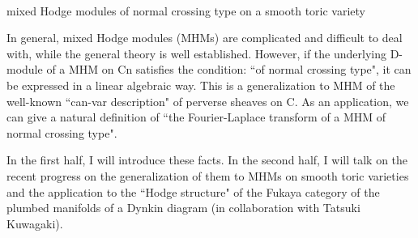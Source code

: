 \documentclass[dvipdfmx,a4paper,12pt]{article}
\theoremstyle{plain} %
\theoremstyle{definition} %
\begin{document}
\\
mixed Hodge modules of normal crossing type on a smooth toric variety

\vskip3mm
In general, mixed Hodge modules (MHMs) are complicated and difficult to 
deal with, while the general theory is well established.
However, if the underlying D-module of a MHM on Cn satisfies the 
condition: ``of normal crossing type",
it can be expressed in a linear algebraic way.
This is a generalization to MHM of the well-known ``can-var description" 
of perverse sheaves on C.
As an application, we can give a natural definition of ``the Fourier-Laplace transform of a MHM of normal crossing type".

In the first half, I will introduce these facts.
In the second half, I will talk on the recent progress on the 
generalization of them to MHMs on smooth toric varieties and the 
application to the ``Hodge structure" of the Fukaya category of the 
plumbed manifolds of a Dynkin diagram (in collaboration with Tatsuki 
Kuwagaki).
\vskip6mm
\end{document}
